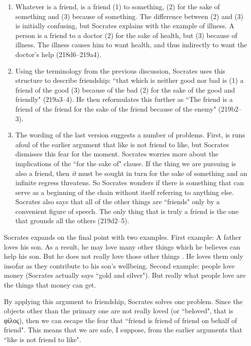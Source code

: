 \documentclass[11pt]{article}
\begin{document}
\begin{enumerate}
    \item Whatever is a friend, is a friend (1) to something, (2) for the sake of something and (3) because of something.  The difference between (2) and (3) is initially confusing, but Socrates explains with the example of illness.  A person is a friend to a doctor (2) for the sake of health, but (3) because of illness.  The illness causes him to want health, and thus indirectly to want the doctor's help (218d6--219a4).
    \item Using the terminology from the previous discussion, Socrates uses this structure to describe friendship: ``that which is neither good nor bad is (1) a friend of the good (3) because of the bad (2) for the sake of the good and friendly" (219a3--4).  He then reformulates this further as ``The friend is a friend of the friend for the sake of the friend because of the enemy" (219b2--3).
    \item The wording of the last version suggests a number of problems.  First, is runs afoul of the earlier argument that like is not friend to like, but Socrates dismisses this fear for the moment.  Socrates worries more about the implications of the ``for the sake of" clause.  If the thing we are pursuing is also a friend, then \emph{it} must be sought in turn for the sake of something and an infinite regress threatens.  So Socrates wonders if there is something that can serve as a beginning of the chain without itself referring to anything else.  Socrates also says that all of the other things are ``friends" only by a convenient figure of speech.  The only thing that is truly a friend is the one that grounds all the others (219d2--5).
\end{enumerate}

Socrates expands on the final point with two examples.  First example: A father loves his son.  As a result, he may love many other things which he believes can help his son.  But he does not really love those other things . He loves them only insofar as they contribute to his son's wellbeing.  Second example: people love money (Socrates actually says ``gold and silver").  But really what people love are the things that money can get.

By applying this argument to friendship, Socrates solves one problem.  Since the objects other than the primary one are not really loved (or ``beloved", that is φίλος), then we can escape the fear that ``friend is friend of friend on behalf of friend".  This means that we are safe, I suppose, from the earlier arguments that ``like is not friend to like".
\end{document}
